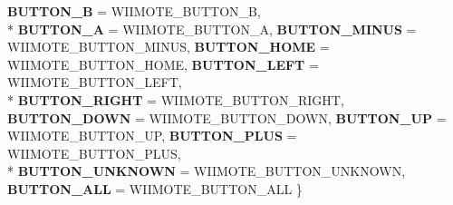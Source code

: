 \begin{DoxyCompactItemize}
{\bfseries B\-U\-T\-T\-O\-N\-\_\-\-B} =  W\-I\-I\-M\-O\-T\-E\-\_\-\-B\-U\-T\-T\-O\-N\-\_\-\-B, 
\\*
{\bfseries B\-U\-T\-T\-O\-N\-\_\-\-A} =  W\-I\-I\-M\-O\-T\-E\-\_\-\-B\-U\-T\-T\-O\-N\-\_\-\-A, 
{\bfseries B\-U\-T\-T\-O\-N\-\_\-\-M\-I\-N\-U\-S} =  W\-I\-I\-M\-O\-T\-E\-\_\-\-B\-U\-T\-T\-O\-N\-\_\-\-M\-I\-N\-U\-S, 
{\bfseries B\-U\-T\-T\-O\-N\-\_\-\-H\-O\-M\-E} =  W\-I\-I\-M\-O\-T\-E\-\_\-\-B\-U\-T\-T\-O\-N\-\_\-\-H\-O\-M\-E, 
{\bfseries B\-U\-T\-T\-O\-N\-\_\-\-L\-E\-F\-T} =  W\-I\-I\-M\-O\-T\-E\-\_\-\-B\-U\-T\-T\-O\-N\-\_\-\-L\-E\-F\-T, 
\\*
{\bfseries B\-U\-T\-T\-O\-N\-\_\-\-R\-I\-G\-H\-T} =  W\-I\-I\-M\-O\-T\-E\-\_\-\-B\-U\-T\-T\-O\-N\-\_\-\-R\-I\-G\-H\-T, 
{\bfseries B\-U\-T\-T\-O\-N\-\_\-\-D\-O\-W\-N} =  W\-I\-I\-M\-O\-T\-E\-\_\-\-B\-U\-T\-T\-O\-N\-\_\-\-D\-O\-W\-N, 
{\bfseries B\-U\-T\-T\-O\-N\-\_\-\-U\-P} =  W\-I\-I\-M\-O\-T\-E\-\_\-\-B\-U\-T\-T\-O\-N\-\_\-\-U\-P, 
{\bfseries B\-U\-T\-T\-O\-N\-\_\-\-P\-L\-U\-S} =  W\-I\-I\-M\-O\-T\-E\-\_\-\-B\-U\-T\-T\-O\-N\-\_\-\-P\-L\-U\-S, 
\\*
{\bfseries B\-U\-T\-T\-O\-N\-\_\-\-U\-N\-K\-N\-O\-W\-N} =  W\-I\-I\-M\-O\-T\-E\-\_\-\-B\-U\-T\-T\-O\-N\-\_\-\-U\-N\-K\-N\-O\-W\-N, 
{\bfseries B\-U\-T\-T\-O\-N\-\_\-\-A\-L\-L} =  W\-I\-I\-M\-O\-T\-E\-\_\-\-B\-U\-T\-T\-O\-N\-\_\-\-A\-L\-L
 \}
\end{DoxyCompactItemize}
